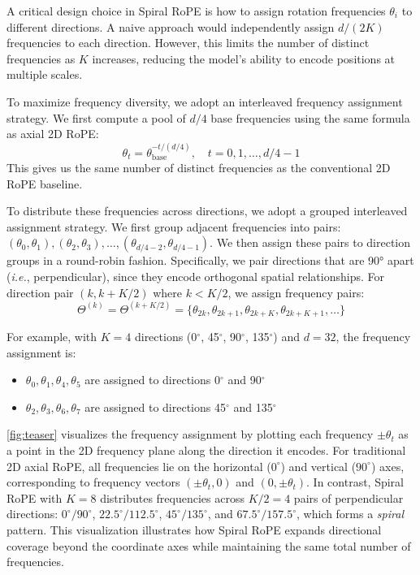 A critical design choice in Spiral RoPE is how to assign rotation frequencies $\theta_i$ to different directions. A naive approach would independently assign $d/(2K)$ frequencies to each direction. However, this limits the number of distinct frequencies as $K$ increases, reducing the model's ability to encode positions at multiple scales.

To maximize frequency diversity, we adopt an interleaved frequency assignment strategy. We first compute a pool of $d/4$ base frequencies using the same formula as axial 2D RoPE:
\begin{equation}
    \theta_t = \theta_{\text{base}}^{-t/(d/4)}, \quad t = 0, 1, \ldots, d/4-1
\end{equation}
This gives us the same number of distinct frequencies as the conventional 2D RoPE baseline. 

To distribute these frequencies across directions, we adopt a grouped interleaved assignment strategy. We first group adjacent frequencies into pairs: $(\theta_0, \theta_1), (\theta_2, \theta_3), \ldots, (\theta_{d/4-2}, \theta_{d/4-1})$. We then assign these pairs to direction groups in a round-robin fashion. Specifically, we pair directions that are 90° apart (\emph{i.e.}, perpendicular), since they encode orthogonal spatial relationships. For direction pair $(k, k + K/2)$ where $k < K/2$, we assign frequency pairs:
\begin{equation}
    \Theta^{(k)} = \Theta^{(k+K/2)} = \{\theta_{2k}, \theta_{2k+1}, \theta_{2k+K}, \theta_{2k+K+1}, \ldots\}
\end{equation}

For example, with $K=4$ directions (0$^\circ$, 45$^\circ$, 90$^\circ$, 135$^\circ$) and $d=32$, the frequency assignment is:
\begin{itemize}
    \item $\theta_0, \theta_1, \theta_4, \theta_5$ are assigned to directions 0$^\circ$ and 90$^\circ$
    \item $\theta_2, \theta_3, \theta_6, \theta_7$ are assigned to directions 45$^\circ$ and 135$^\circ$
\end{itemize}

\cref{fig:teaser} visualizes the frequency assignment by plotting each frequency $\pm\theta_t$ as a point in the 2D frequency plane along the direction it encodes. For traditional 2D axial RoPE, all frequencies lie on the horizontal ($0^\circ$) and vertical ($90^\circ$) axes, corresponding to frequency vectors $(\pm\theta_t, 0)$ and $(0, \pm\theta_t)$. In contrast, Spiral RoPE with $K=8$ distributes frequencies across $K/2=4$ pairs of perpendicular directions: $0^\circ/90^\circ$, $22.5^\circ/112.5^\circ$, $45^\circ/135^\circ$, and $67.5^\circ/157.5^\circ$, which forms a \textit{spiral} pattern. This visualization illustrates how Spiral RoPE expands directional coverage beyond the coordinate axes while maintaining the same total number of frequencies.

